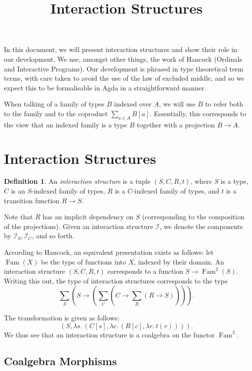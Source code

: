 \documentclass{article}
\title{\vspace{-2cm}Interaction Structures}
\theoremstyle{definition}
\newtheorem{definition}[theorem]{Definition}
\newcommand{\mc}[1]{\mathcal{#1}}
\newcommand{\iss}[1]{\mathcal{#1}_S}
\newcommand{\isc}[1]{\mathcal{#1}_C}
\DeclareMathOperator{\Fam}{Fam}
\begin{document}
    \maketitle

    In this document, we will present interaction structures and show their role in our development.  We use, amongst
    other things, the work of Hancock (Ordinals and Interactive Programs).  Our development is phrased in type
    theoretical term terms, with care taken to avoid the use of the law of excluded middle, and so we expect this to be
    formalisable in Agda in a straightforward manner.

    When talking of a family of types $B$ indexed over $A$, we will use $B$ to refer both to the family and to the
    coproduct $\sum_{a \in A} B[a]$.  Essentially, this corresponds to the view that an indexed family is a type $B$
    together with a projection $B \to A$.

    \section{Interaction Structures}

    \begin{definition}
        An \emph{interaction structure} is a tuple $(S, C, R, t)$, where $S$ is a type, $C$ is an $S$-indexed family of
        types, $R$ is a $C$-indexed family of types, and $t$ is a transition function $R \to S$.
    \end{definition}

    Note that $R$ has an implicit dependency on $S$ (corresponding to the composition of the projections).  Given an
    interaction structure $\mc I$, we denote the components by $\iss I, \isc I$, and so forth.

    According to Hancock, an equivalent presentation exists as follows: let $\Fam(X)$ be the type of functions into $X$,
    indexed by their domain. An interaction structure $(S, C, R, t)$ corresponds to a function $S \to \Fam^2(S)$.
    Writing this out, the type of interaction structures corresponds to the type
    \[
        \sum_S (S \to (\sum_C (C \to \sum_R (R \to S)))).
    \]

    The transformation is given as follows:
    \[
        (S, \lambda s.\, (C[s], \lambda c.\, (R[c], \lambda r.\, t(r)))).
    \]
    We thus see that an interaction structure is a coalgebra on the functor $\Fam^2$.

    \subsection{Coalgebra Morphisms}
\end{document}
